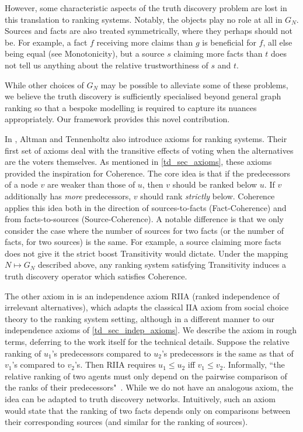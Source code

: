 However, some characteristic aspects of the truth discovery problem are lost in
this translation to ranking systems. Notably, the objects play no role at all
in $G_N$. Sources and facts are also treated symmetrically, where they perhaps
should not be. For example, a fact $f$ receiving more claims than $g$ is
beneficial for $f$, all else being equal (see Monotonicity), but a source $s$
claiming more facts than $t$ does not tell us anything about the relative
trustworthiness of $s$ and $t$.

While other choices of $G_N$ may be possible to alleviate some of these
problems, we believe the truth discovery is sufficiently specialised beyond
general graph ranking so that a bespoke modelling is required to capture its
nuances appropriately. Our framework provides this novel contribution.

In \cite{altman2008}, Altman and Tennenholtz also introduce axioms for ranking
systems. Their first set of axioms deal with the transitive effects of voting
when the alternatives are the voters themselves. As mentioned in
\cref{td_sec_axioms}, these axioms provided the inspiration for Coherence. The
core idea is that if the predecessors of a node $v$ are weaker than those of
$u$, then $v$ should be ranked below $u$. If $v$ additionally has \emph{more}
predecessors, $v$ should rank \emph{strictly} below. Coherence applies this
idea both in the direction of sources-to-facts (Fact-Coherence) and from
facts-to-sources (Source-Coherence). A notable difference is that we only
consider the case where the number of sources for two facts (or the number of
facts, for two sources) is the same. For example, a source claiming more facts
does not give it the strict boost Transitivity would dictate. Under the mapping $N
\mapsto G_N$ described above, any ranking system satisfying Transitivity
induces a truth discovery operator which satisfies Coherence.

The other axiom in \cite{altman2008} is an independence axiom RIIA (ranked
independence of irrelevant alternatives), which adapts the classical IIA axiom
from social choice theory to the ranking system setting, although in a
different manner to our independence axioms of \cref{td_sec_indep_axioms}. We
describe the axiom in rough terms, deferring to the work itself for the technical
details. Suppose the relative ranking of $u_1$'s predecessors compared to
$u_2$'s predecessors is the same as that of $v_1$'s compared to $v_2$'s. Then
RIIA requires $u_1 \le u_2$ iff $v_1 \le v_2$. Informally, ``the relative
ranking of two agents must only depend on the pairwise comparison of the ranks
of their predecessors"~\cite{altman2008}.
%
While we do not have an analogous axiom, the idea can be adapted to truth
discovery networks. Intuitively, such an axiom would state that the ranking of
two facts depends only on comparisons between their
corresponding sources (and similar for the ranking of sources).

